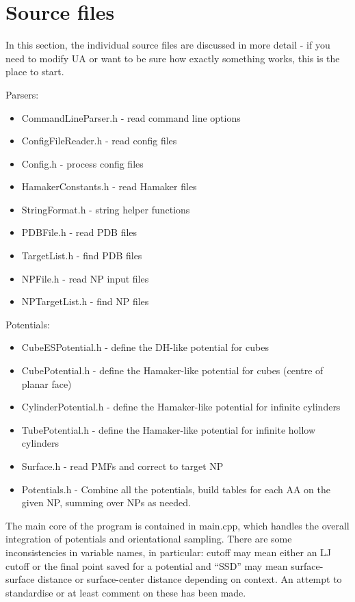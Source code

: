 \documentclass[10pt,a4paper,onecolumn]{report}
\begin{document}
\section{Source files}
In this section, the individual source files are discussed in more detail - if you need to modify UA or want to be sure how exactly something works, this is the place to start.

Parsers:
\begin{itemize}
\item CommandLineParser.h - read command line options
\item ConfigFileReader.h - read config files
\item Config.h - process config files
\item HamakerConstants.h - read Hamaker files
\item StringFormat.h - string helper functions
\item PDBFile.h - read PDB files
\item TargetList.h - find PDB files
\item NPFile.h - read NP input files
\item NPTargetList.h - find NP files

\end{itemize} 

Potentials:
\begin{itemize}
\item CubeESPotential.h - define the DH-like potential for cubes
\item CubePotential.h - define the Hamaker-like potential for cubes (centre of planar face)
\item CylinderPotential.h - define the Hamaker-like potential for infinite cylinders
\item TubePotential.h - define the Hamaker-like potential for infinite hollow cylinders
\item Surface.h - read PMFs and correct to target NP
\item Potentials.h - Combine all the potentials, build tables for each AA on the given NP, summing over NPs as needed. 
\end{itemize}

The main core of the program is contained in main.cpp, which handles the overall integration of potentials and orientational sampling. There are some inconsistencies in variable names, in particular: cutoff may mean either an LJ cutoff or the final point saved for a potential and ``SSD'' may mean surface-surface distance or surface-center distance depending on context. An attempt to standardise or at least comment on these has been made. 
\end{document}
